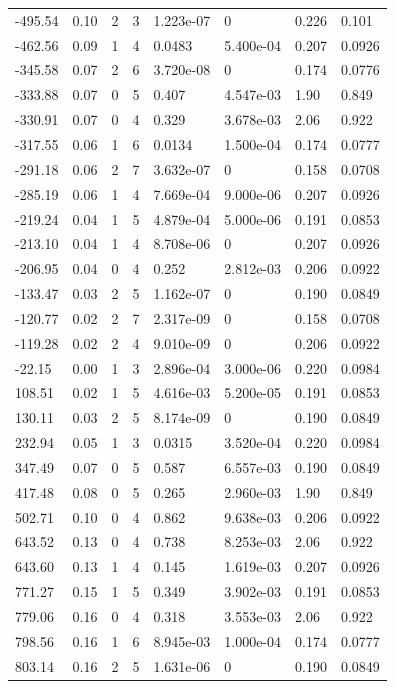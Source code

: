 \documentclass[preview]{standalone}
\begin{document}
{{\begin{tabular}{L{1.2cm}C{1.2cm} C{0.3cm}C{0.5cm} C{1.4cm}C{1.4cm} C{1.4cm}C{1.4cm}}
  -495.54  &  0.10  & 2     &  3 &  1.223e-07  & 0  & 0.226 &  0.101   \\ 
  -462.56  &  0.09  & 1     &  4 &  0.0483  & 5.400e-04  & 0.207 &  0.0926   \\ 
  -345.58  &  0.07  & 2     &  6 &  3.720e-08  & 0  & 0.174 &  0.0776   \\ 
  -333.88  &  0.07  & 0     &  5 &  0.407  & 4.547e-03  & 1.90 &  0.849   \\ 
  -330.91  &  0.07  & 0     &  4 &  0.329  & 3.678e-03  & 2.06 &  0.922   \\ 
  -317.55  &  0.06  & 1     &  6 &  0.0134  & 1.500e-04  & 0.174 &  0.0777   \\ 
  -291.18  &  0.06  & 2     &  7 &  3.632e-07  & 0  & 0.158 &  0.0708   \\ 
  -285.19  &  0.06  & 1     &  4 &  7.669e-04  & 9.000e-06  & 0.207 &  0.0926   \\ 
  -219.24  &  0.04  & 1     &  5 &  4.879e-04  & 5.000e-06  & 0.191 &  0.0853   \\ 
  -213.10  &  0.04  & 1     &  4 &  8.708e-06  & 0  & 0.207 &  0.0926   \\ 
  -206.95  &  0.04  & 0     &  4 &  0.252  & 2.812e-03  & 0.206 &  0.0922   \\ 
  -133.47  &  0.03  & 2     &  5 &  1.162e-07  & 0  & 0.190 &  0.0849   \\ 
  -120.77  &  0.02  & 2     &  7 &  2.317e-09  & 0  & 0.158 &  0.0708   \\ 
  -119.28  &  0.02  & 2     &  4 &  9.010e-09  & 0  & 0.206 &  0.0922   \\ 
  -22.15  &  0.00  & 1     &  3 &  2.896e-04  & 3.000e-06  & 0.220 &  0.0984   \\ 
  108.51  &  0.02  & 1     &  5 &  4.616e-03  & 5.200e-05  & 0.191 &  0.0853   \\ 
  130.11  &  0.03  & 2     &  5 &  8.174e-09  & 0  & 0.190 &  0.0849   \\ 
  232.94  &  0.05  & 1     &  3 &  0.0315  & 3.520e-04  & 0.220 &  0.0984   \\ 
  347.49  &  0.07  & 0     &  5 &  0.587  & 6.557e-03  & 0.190 &  0.0849   \\ 
  417.48  &  0.08  & 0     &  5 &  0.265  & 2.960e-03  & 1.90 &  0.849   \\ 
  502.71  &  0.10  & 0     &  4 &  0.862  & 9.638e-03  & 0.206 &  0.0922   \\ 
  643.52  &  0.13  & 0     &  4 &  0.738  & 8.253e-03  & 2.06 &  0.922   \\ 
  643.60  &  0.13  & 1     &  4 &  0.145  & 1.619e-03  & 0.207 &  0.0926   \\ 
  771.27  &  0.15  & 1     &  5 &  0.349  & 3.902e-03  & 0.191 &  0.0853   \\ 
  779.06  &  0.16  & 0     &  4 &  0.318  & 3.553e-03  & 2.06 &  0.922   \\ 
  798.56  &  0.16  & 1     &  6 &  8.945e-03  & 1.000e-04  & 0.174 &  0.0777   \\ 
  803.14  &  0.16  & 2     &  5 &  1.631e-06  & 0  & 0.190 &  0.0849   \\ 
\hline 
\end{tabular} 

}}
\end{document}

